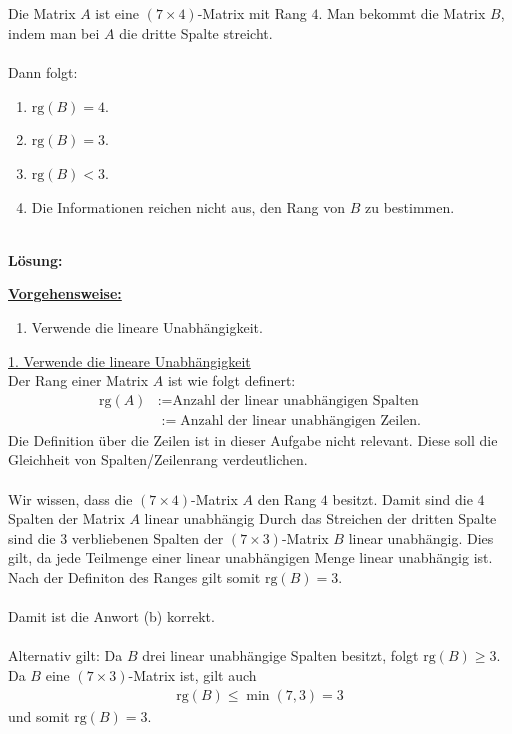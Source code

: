 \subsection*{}
Die Matrix $ A $ ist eine $ (7 \times 4) $-Matrix mit Rang $ 4 $.
Man bekommt die Matrix $ B $, indem man bei $ A $ die dritte Spalte streicht.\\
\\
Dann folgt:
\renewcommand{\labelenumi}{(\alph{enumi})}
\begin{enumerate}
	\item 
	$ \mathrm{rg}(B) = 4 $.
	\item
	$ \mathrm{rg}(B) = 3 $.
	
	\item
	$ \mathrm{rg}(B) < 3 $.
	
	\item
	Die Informationen reichen nicht aus, den Rang von $ B $ zu bestimmen.
\end{enumerate}
\ \\
\textbf{Lösung:}
\begin{mdframed}
	\underline{\textbf{Vorgehensweise:}}
	\renewcommand{\labelenumi}{\theenumi.}
	\begin{enumerate}
		\item Verwende die lineare Unabhängigkeit. 
	\end{enumerate}
\end{mdframed}

\underline{1. Verwende die lineare Unabhängigkeit}\\
Der Rang einer Matrix $ A $ ist wie folgt definert:
\begin{align*}
	\mathrm{rg}(A) &:= \textrm{Anzahl der linear unabhängigen Spalten}\\
	&:=\textrm{Anzahl der linear unabhängigen Zeilen}.
\end{align*}
Die Definition über die Zeilen ist in dieser Aufgabe nicht relevant. Diese soll die Gleichheit von Spalten/Zeilenrang verdeutlichen.\\
\\
Wir wissen, dass die $ (7 \times 4) $-Matrix $ A $ den Rang $ 4 $ besitzt. 
Damit sind die $ 4 $ Spalten der Matrix $ A $ linear unabhängig 
Durch das Streichen der dritten Spalte sind die $ 3 $ verbliebenen Spalten der $ (7 \times 3) $-Matrix $ B $ linear unabhängig.
Dies gilt, da jede Teilmenge einer linear unabhängigen Menge linear unabhängig ist. Nach der Definiton des Ranges gilt somit $ \mathrm{rg}(B) = 3 $.\\
\\
Damit ist die Anwort (b) korrekt.\\
\\
Alternativ gilt: Da $ B $ drei linear unabhängige Spalten besitzt, folgt $ \mathrm{rg}(B) \geq 3 $. Da $ B $ eine $ (7 \times 3) $-Matrix ist, gilt auch
\begin{align*}
	\mathrm{rg}(B) \leq \min(7,3) = 3
\end{align*}
und somit $ \mathrm{rg}(B) = 3 $.


